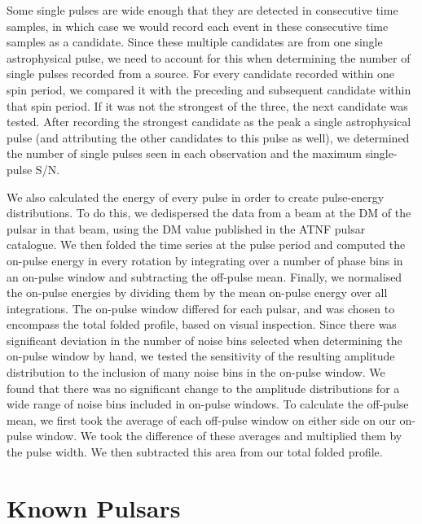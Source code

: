 \documentclass[fleqn,usenatbib]{mnras}
\begin{document}
Some single pulses are wide enough that they are detected in consecutive time samples, in which case we would record each event in these consecutive time samples as a candidate. Since these multiple candidates are from one single astrophysical pulse, we need to account for this when determining the number of single pulses recorded from a source. For every candidate recorded
within one spin period, we compared it with the preceding and subsequent candidate within that spin period. If it was not the strongest of the three, the next candidate was tested. After recording the strongest candidate as the peak a single astrophysical pulse (and attributing the other candidates to this pulse as well), we determined the number of single pulses seen in each observation and the maximum single-pulse S/N.

We also calculated the energy of every pulse in order to create pulse-energy distributions. To do this, we dedispersed the data from a beam at the DM of the pulsar in that beam, using the DM value published in the ATNF pulsar catalogue. We then folded the time series at the pulse period and computed the on-pulse energy in every rotation by integrating over a number of phase bins in an on-pulse window and subtracting the off-pulse mean. Finally, we normalised the on-pulse energies by dividing them by the mean on-pulse energy over all integrations. The on-pulse window differed for each pulsar, and was chosen to encompass the total folded profile, based on visual inspection. Since there was significant deviation in the number of noise bins selected when determining the on-pulse window by hand, we tested the sensitivity of the resulting amplitude distribution to the inclusion of many noise bins in the on-pulse window. We found that there was no significant change to the amplitude distributions for a wide range of noise bins included in on-pulse windows. To calculate the off-pulse mean, we first took the average of each off-pulse window on either side on our on-pulse window. We took the difference of these averages and multiplied them by the pulse width. We then subtracted this area from our total folded profile.

\section{Known Pulsars}
\label{known}
\end{document}
